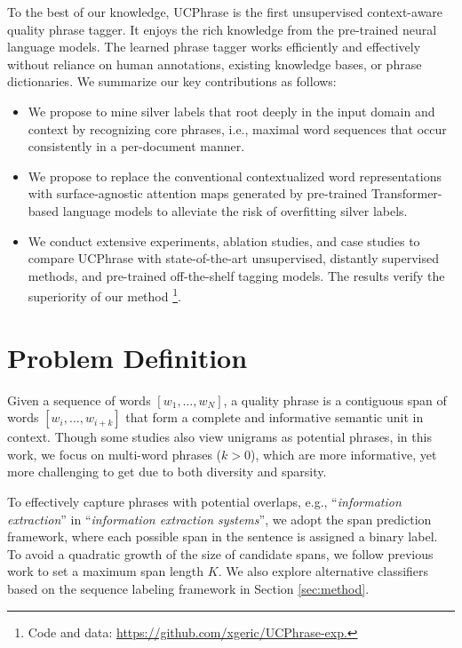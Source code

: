 \documentclass[sigconf]{acmart}
\newcommand{\our}{\mbox{UCPhrase}\xspace}
\newcommand{\ie}{\mbox{i.e.}\xspace}
\newcommand{\eg}{\mbox{e.g.}\xspace}
\newcommand{\example}[1]{``\emph{#1}''}
\begin{document}
\smallskip\noindent
To the best of our knowledge, \our is the first unsupervised context-aware quality phrase tagger.
It enjoys the rich knowledge from the pre-trained neural language models.
The learned phrase tagger works efficiently and effectively without reliance on human annotations, existing knowledge bases, or phrase dictionaries.
We summarize our key contributions as follows:
\begin{itemize}[leftmargin=*,nosep]
\item We propose to mine silver labels that root deeply in the input domain and context by recognizing core phrases, \ie, maximal word sequences that occur consistently in a per-document manner. 
\item We propose to replace the conventional contextualized word representations with surface-agnostic attention maps generated by pre-trained Transformer-based language models to alleviate the risk of overfitting silver labels.
\item We conduct extensive experiments, ablation studies, and case studies to compare \our with state-of-the-art unsupervised, distantly supervised methods, and pre-trained off-the-shelf tagging models. The results verify the superiority of our method
\footnote{Code and data: \href{https://github.com/xgeric/UCPhrase-reproduce}{\color{blue}https://github.com/xgeric/UCPhrase-exp.}}. 
\end{itemize}
 \section{Problem Definition}

Given a sequence of words $[w_1, \ldots, w_N]$, a quality phrase is a contiguous span of words $[w_i, \ldots, w_{i+k}]$ that form a complete and informative semantic unit in context.
Though some studies also view unigrams as potential phrases, in this work, we focus on multi-word phrases ($k > 0$), which are more informative, yet more challenging to get due to both diversity and sparsity.

To effectively capture phrases with potential overlaps, \eg, \example{information extraction} in \example{information extraction systems}, 
we adopt the span prediction framework, where each possible span in the sentence is assigned a binary label.
To avoid a quadratic growth of the size of candidate spans, we follow previous work \cite{liu2015mining, shang2018automated} to set a maximum span length $K$.
We also explore alternative classifiers based on the sequence labeling framework in Section \ref{sec:method}.
\end{document}
